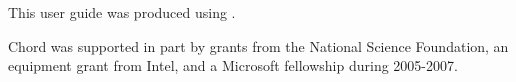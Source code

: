 \documentclass{article}
\begin{document}
This user guide was produced using .

Chord was supported in part by grants from the National Science Foundation, an equipment grant from Intel, and a Microsoft fellowship during 2005-2007.
\end{document}
